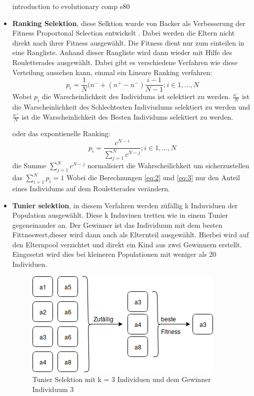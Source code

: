 \begin{itemize}
introduction to evolutionary comp s80
\fi




\item \textbf{Ranking Selektion}, diese Selktion wurde von Backer als Verbesserung der Fitness Proportonal Selection entwickelt \cite{baker1985adaptive}. Dabei werden die Eltern nicht direkt nach ihrer Fitness ausgewählt. Die Fitness dient nur zum einteilen in eine Rangliste. Anhand dieser Rangliste wird dann wieder mit Hilfe des Rouletterades ausgewählt. Dabei gibt es verschiedene Verfahren wie diese Verteilung aussehen kann, einmal ein Lineare Ranking verfahren:
\begin{equation}	
	p_i = \frac{1}{N}(n^- + (n^+ - n^- ) \frac{i-1}{N-1}; i\in{1,...,N} \label{eq:2}
\end{equation}
Wobei $p_i$ die Warscheinlichkeit des Individums ist selektiert zu werden. $\frac{n^-}{N}$ ist die Warscheinlichkeit des Schlechtesten Indiviudums selektiert zu werden und  $\frac{n^+}{N}$ ist die Warscheinlichkeit des Besten Individums selektiert zu werden.

oder das expontienelle Ranking:
\begin{equation}
	p_i = \frac{c^{N-i}}{\sum_{j=1}^N c^{N-j}}; i\in{1,...,N} \label{eq:3}
\end{equation}
die Summe $\sum_{j=1}^N c^{N-j}$ normalisiert die Wahrscheilichkeit um sicherzustellen das $\sum_{i=1}^N p_i = 1$
Wobei die Berechnungen \ref{eq:2} und \ref{eq:3} nur den Anteil eines Individums auf dem Rouletterades verändern.

\item \textbf{Tunier selektion}, in diesem Verfahren werden züfällig k Induviduen der Population ausgewählt. Diese k Induviuen  tretten wie in einem Tunier gegeneinander an. Der Gewinner ist das Individuum mit dem besten Fittneswert,dieser wird dann auch als Elternteil ausgewählt. Hierbei wird auf den Elternpool verzichtet und direkt ein Kind aus zwei Gewinnern erstellt. Eingesetzt wird dies bei kleineren Populationen mit weniger als 20 Individuen.

\begin{figure}[htb]
  \centering  
  \includegraphics[scale=0.7]{img/tunier.png}
  \caption{Tunier Selektion mit k = 3 Individuen und dem Gewinner Individuum 3}
  \label{fig:roulette_wheel}
\end{figure}



\end{itemize}
